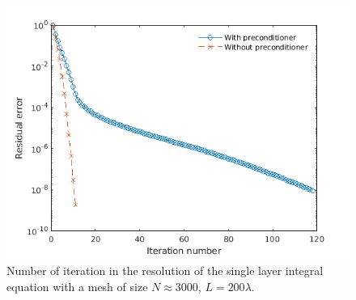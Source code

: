 \documentclass[a4paper]{article}
\begin{document}
\begin{figure}[H]
	\centering
	\includegraphics[scale=0.5]{figs/PrecondDirichletHelmSegPDFbis}
	\caption{Number of iteration in the resolution of the single layer integral equation with a mesh of size $N \approx 3000$, $L = 200 \lambda$.}
	\label{FigureNitHelmDirichlet}
\end{figure}
\end{document}
